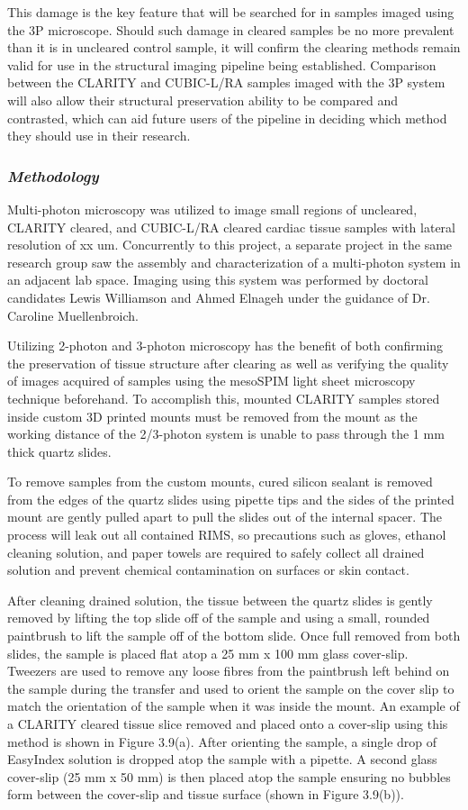 This damage is the key feature that will be searched for in samples imaged using the 3P microscope. Should such damage in cleared samples be no more prevalent than it is in uncleared control sample, it will confirm the clearing methods remain valid for use in the structural imaging pipeline being established. Comparison between the CLARITY and CUBIC-L/RA samples imaged with the 3P system will also allow their structural preservation ability to be compared and contrasted, which can aid future users of the pipeline in deciding which method they should use in their research.

\subsubsection{\textit{Methodology}}
 Multi-photon microscopy was utilized to image small regions of uncleared, CLARITY cleared, and CUBIC-L/RA cleared cardiac tissue samples with lateral resolution of xx um. Concurrently to this project, a separate project in the same research group saw the assembly and characterization of a multi-photon system in an adjacent lab space. Imaging using this system was performed by doctoral candidates Lewis Williamson and Ahmed Elnageh under the guidance of Dr. Caroline Muellenbroich. 
 
 Utilizing 2-photon and 3-photon microscopy has the benefit of both confirming the preservation of tissue structure after clearing as well as verifying the quality of images acquired of samples using the mesoSPIM light sheet microscopy technique beforehand. To accomplish this, mounted CLARITY samples stored inside custom 3D printed mounts must be removed from the mount as the working distance of the 2/3-photon system is unable to pass through the 1 mm thick quartz slides.
 
 To remove samples from the custom mounts, cured silicon sealant is removed from the edges of the quartz slides using pipette tips and the sides of the printed mount are gently pulled apart to pull the slides out of the internal spacer. The process will leak out all contained RIMS, so precautions such as gloves, ethanol cleaning solution, and paper towels are required to safely collect all drained solution and prevent chemical contamination on surfaces or skin contact.

 After cleaning drained solution, the tissue between the quartz slides is gently removed by lifting the top slide off of the sample and using a small, rounded paintbrush to lift the sample off of the bottom slide. Once full removed from both slides, the sample is placed flat atop a 25 mm x 100 mm glass cover-slip. Tweezers are used to remove any loose fibres from the paintbrush left behind on the sample during the transfer and used to orient the sample on the cover slip to match the orientation of the sample when it was inside the mount. An example of a CLARITY cleared tissue slice removed and placed onto a cover-slip using this method is shown in Figure 3.9(a). After orienting the sample, a single drop of EasyIndex solution is dropped atop the sample with a pipette. A second  glass cover-slip (25 mm x 50 mm) is then placed atop the sample ensuring no bubbles form between the cover-slip and tissue surface (shown in Figure 3.9(b)). 

